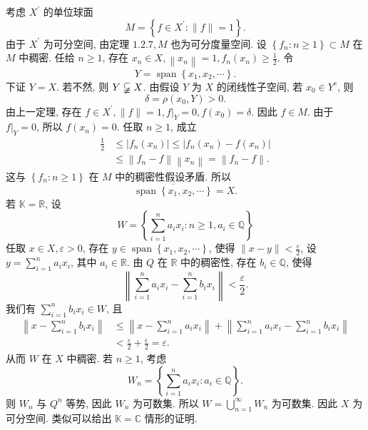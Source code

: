 \documentclass[openany]{ctexbook}
\makeatletter
\theoremstyle{kaiti}
\theoremstyle{normal}
\renewenvironment{proof}[1][\proofname]{\par
    \pushQED{\qed}%
    \normalfont \topsep6\p@\@plus6\p@\relax
    \trivlist
    \item\relax
    {\heiti #1}\hspace{2\labelsep}\ignorespaces
  }{%
    \popQED\endtrivlist\@endpefalse
  }
\makeatother
\begin{document}
\begin{proof}
考虑 $X^{\prime}$ 的单位球面
$$
M=\left\{f \in X^{\prime}:\|f\|=1\right\}.
$$
由于 $X^{\prime}$ 为可分空间, 由定理 $1.2.7, M$ 也为可分度量空间. 设 $\left\{f_n: n \geqslant 1\right\} \subset M$ 在 $M$ 中稠密.
任给 $n \geqslant 1$, 存在 $x_n \in X,\left\|x_n\right\|=1, f_n\left(x_n\right) \geqslant \frac{1}{2}$. 令
$$
Y=\overline{\operatorname{span}\left\{x_1, x_2, \cdots\right\}}.
$$
下证 $Y=X$. 若不然, 则 $Y \varsubsetneqq X$. 由假设 $Y$ 为 $X$ 的闭线性子空间, 若 $x_0 \in Y^{c}$, 则
$$
\delta=\rho\left(x_0, Y\right)>0.
$$
由上一定理, 存在 $f \in X^{\prime},\|f\|=1,\left.f\right|_{Y}=0, f\left(x_0\right)=\delta$. 因此 $f \in M$. 由于 $\left.f\right|_{Y}=0$, 所以 $f\left(x_n\right)=0$. 任取 $n \geqslant 1$, 成立
$$
\begin{aligned}
\frac{1}{2} & \leqslant\left|f_n\left(x_n\right)\right| \leqslant\left|f_n\left(x_n\right)-f\left(x_n\right)\right| \\
& \leqslant\left\|f_n-f\right\|\left\|x_n\right\|=\left\|f_n-f\right\|.
\end{aligned}
$$
这与 $\left\{f_n: n \geqslant 1\right\}$ 在 $M$ 中的稠密性假设矛盾. 所以
$$
\overline{\operatorname{span}\left\{x_1, x_2, \cdots\right\}}=X.
$$
若 $\mathbb{K}=\mathbb{R}$, 设
$$
W=\left\{\sum_{i=1}^n a_{i} x_{i}: n \geqslant 1, a_{i} \in \mathbb{Q}\right\}
$$
任取 $x \in X, \varepsilon>0$, 存在 $y \in \operatorname{span}\left\{x_1, x_2, \cdots\right\}$, 使得 $\|x-y\|<\frac{\varepsilon}{2}$, 设 $y=\sum_{i=1}^n a_{i} x_{i}$, 其中 $a_{i} \in \mathbb{R}$. 由 $Q$ 在 $\mathbb{R}$ 中的稠密性, 存在 $b_{i} \in \mathbb{Q}$, 使得
$$
\left\|\sum_{i=1}^n a_{i} x_{i}-\sum_{i=1}^n b_{i} x_{i}\right\|<\frac{\varepsilon}{2}.
$$
我们有 $\sum_{i=1}^n b_{i} x_{i} \in W$, 且
$$
\begin{aligned}
\left\|x-\sum_{i=1}^n b_{i} x_{i}\right\| & \leqslant\left\|x-\sum_{i=1}^n a_{i} x_{i}\right\|+\left\|\sum_{i=1}^n a_{i} x_{i}-\sum_{i=1}^n b_{i} x_{i}\right\| \\
&<\frac{\varepsilon}{2}+\frac{\varepsilon}{2}=\varepsilon.
\end{aligned}
$$
从而 $W$ 在 $X$ 中稠密. 若 $n \geqslant 1$, 考虑
$$
W_n=\left\{\sum_{i=1}^n a_{i} x_{i}: a_{i} \in \mathbb{Q}\right\}.
$$
则 $W_n$ 与 $Q^n$ 等势, 因此 $W_n$ 为可数集. 所以 $W=\bigcup_{n=1}^{\infty} W_n$ 为可数集. 因此 $X$ 为可分空间. 类似可以给出 $\mathbb{K}=\mathbb{C}$ 情形的证明.
\end{proof}
\end{document}
